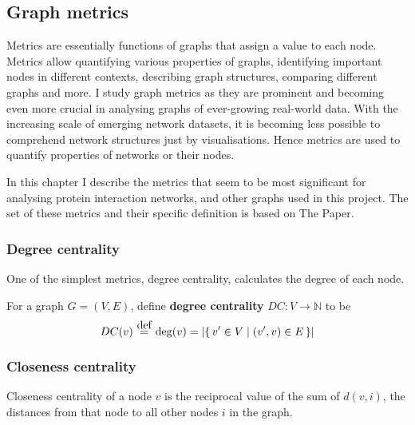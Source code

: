 \begin{definition}[Preorder]

\end{definition}

\begin{definition}

\end{definition}

\subsection{Graph metrics}

Metrics are essentially functions of graphs that assign a value to each node.
Metrics allow quantifying various properties of graphs, identifying important nodes in different contexts, describing graph structures, comparing different graphs and more.
I study graph metrics as they are prominent and becoming even more crucial in analysing graphs of ever-growing real-world data.
With the increasing scale of emerging network datasets, it is becoming less possible to comprehend network structures just by visualisations.
Hence metrics are used to quantify properties of networks or their nodes.

In this chapter I describe the metrics that seem to be most significant for analysing protein interaction networks, and other graphs used in this project. The set of these metrics and their specific definition is based on The Paper\cite{Bozhilova2019}.

\subsubsection{Degree centrality}

One of the simplest metrics, degree centrality, calculates the degree of each node.

\begin{definition}
    For a graph $G = (V, E)$, define \textbf{degree centrality} $DC : V \rightarrow \mathbb{N}$ to be
    \[ DC(v) \eqdef \deg(v) = \left| \Set{v' \in V}{(v', v) \in E} \right| \]
\end{definition}

\subsubsection{Closeness centrality}

Closeness centrality of a node $v$ is the reciprocal value of the sum of $d(v, i)$, the distances from that node to all other nodes $i$ in the graph.

